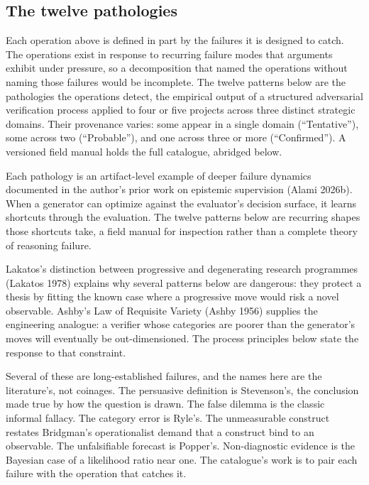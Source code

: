 \documentclass[
  11pt,
]{article}
\begin{document}
\subsection{The twelve pathologies}\label{the-twelve-pathologies}

Each operation above is defined in part by the failures it is designed to
catch. The operations exist in response to recurring failure modes that
arguments exhibit under pressure, so a decomposition that named the
operations without naming those failures would be incomplete. The twelve
patterns below are the pathologies the operations detect, the empirical
output of a structured adversarial verification process applied to four
or five projects across three distinct strategic domains. Their
provenance varies: some appear in a single domain
(``Tentative''), some across two (``Probable''), and one across three or more
(``Confirmed''). A versioned field manual holds the full catalogue, abridged
below.

Each pathology is an artifact-level example of deeper failure dynamics
documented in the author's prior work on epistemic supervision (Alami
2026b). When a generator can optimize against the evaluator's decision
surface, it learns shortcuts through the evaluation. The twelve patterns
below are recurring shapes those shortcuts take, a field manual for
inspection rather than a complete theory of reasoning failure.

Lakatos's
distinction between progressive and degenerating research
programmes (Lakatos 1978) explains why several patterns below are
dangerous: they protect a thesis by fitting the known case where a
progressive move would risk a novel observable. Ashby's Law of Requisite
Variety (Ashby 1956) supplies the engineering analogue: a verifier whose
categories are poorer than the generator's moves will eventually be
out-dimensioned. The process principles below state the response to that
constraint.

Several of these are long-established failures, and the names here are the literature's, not coinages. The persuasive definition is Stevenson's, the conclusion made true by how the question is drawn. The false dilemma is the classic informal fallacy. The category error is Ryle's. The unmeasurable construct restates Bridgman's operationalist demand that a construct bind to an observable. The unfalsifiable forecast is Popper's. Non-diagnostic evidence is the Bayesian case of a likelihood ratio near one. The catalogue's work is to pair each failure with the operation that catches it.
\end{document}
